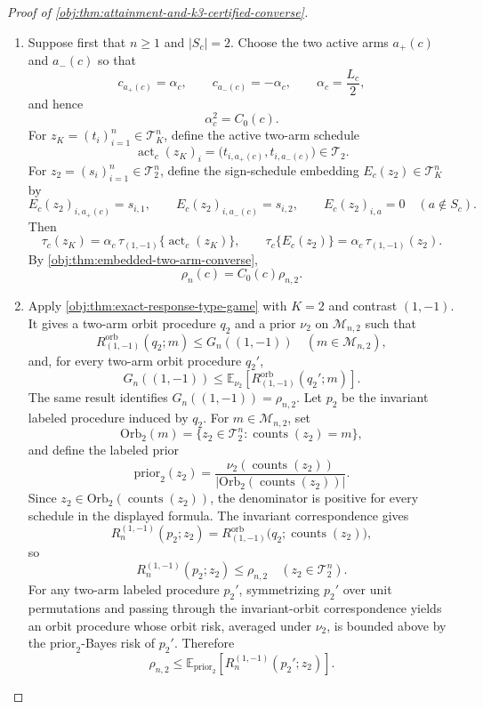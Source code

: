 \documentclass[11pt]{article}
\begin{document}
\begin{proof}[Proof of \cref{obj:thm:attainment-and-k3-certified-converse}]
\begin{enumerate}
\item Suppose first that \(n\ge 1\) and \(|S_c|=2\). Choose the two active arms \(a_+(c)\) and \(a_-(c)\) so that
\[
c_{a_+(c)}=\alpha_c,\qquad c_{a_-(c)}=-\alpha_c,\qquad
\alpha_c=\frac{L_c}{2},
\]
and hence
\[
\alpha_c^2=C_0(c).
\]
For \(z_K=(t_i)_{i=1}^n\in\mathcal T_K^n\), define the active two-arm schedule
\[
\operatorname{act}_c(z_K)_i
=
\bigl(t_{i,a_+(c)},t_{i,a_-(c)}\bigr)\in\mathcal T_2.
\]
For \(z_2=(s_i)_{i=1}^n\in\mathcal T_2^n\), define the sign-schedule embedding \(E_c(z_2)\in\mathcal T_K^n\) by
\[
E_c(z_2)_{i,a_+(c)}=s_{i,1},\qquad
E_c(z_2)_{i,a_-(c)}=s_{i,2},\qquad
E_c(z_2)_{i,a}=0\quad(a\notin S_c).
\]
Then
\[
\tau_c(z_K)
=
\alpha_c\,\tau_{(1,-1)}\{\operatorname{act}_c(z_K)\},
\qquad
\tau_c\{E_c(z_2)\}
=
\alpha_c\,\tau_{(1,-1)}(z_2).
\]
By \cref{obj:thm:embedded-two-arm-converse},
\[
\rho_n(c)=C_0(c)\rho_{n,2}.
\]

\item Apply \cref{obj:thm:exact-response-type-game} with \(K=2\) and contrast \((1,-1)\). It gives a two-arm orbit procedure \(q_2\) and a prior \(\nu_2\) on \(\mathcal M_{n,2}\) such that
\[
R^{\mathrm{orb}}_{(1,-1)}(q_2;m)\le G_n((1,-1))
\quad(m\in\mathcal M_{n,2}),
\]
and, for every two-arm orbit procedure \(q_2'\),
\[
G_n((1,-1))
\le
\mathbb E_{\nu_2}\!\left[
R^{\mathrm{orb}}_{(1,-1)}(q_2';m)
\right].
\]
The same result identifies \(G_n((1,-1))=\rho_{n,2}\). Let \(p_2\) be the invariant labeled procedure induced by \(q_2\). For \(m\in\mathcal M_{n,2}\), set
\[
\mathrm{Orb}_2(m)
=
\{z_2\in\mathcal T_2^n:\operatorname{counts}(z_2)=m\},
\]
and define the labeled prior
\[
\mathrm{prior}_2(z_2)
=
\frac{\nu_2(\operatorname{counts}(z_2))}
{|\mathrm{Orb}_2(\operatorname{counts}(z_2))|}.
\]
Since \(z_2\in \mathrm{Orb}_2(\operatorname{counts}(z_2))\), the denominator is positive for every schedule in the displayed formula. The invariant correspondence gives
\[
R_n^{(1,-1)}(p_2;z_2)
=
R^{\mathrm{orb}}_{(1,-1)}
\bigl(q_2;\operatorname{counts}(z_2)\bigr),
\]
so
\[
R_n^{(1,-1)}(p_2;z_2)\le \rho_{n,2}
\quad(z_2\in\mathcal T_2^n).
\]
For any two-arm labeled procedure \(p_2'\), symmetrizing \(p_2'\) over unit permutations and passing through the invariant-orbit correspondence yields an orbit procedure whose orbit risk, averaged under \(\nu_2\), is bounded above by the \(\mathrm{prior}_2\)-Bayes risk of \(p_2'\). Therefore
\[
\rho_{n,2}
\le
\mathbb E_{\mathrm{prior}_2}\!\left[
R_n^{(1,-1)}(p_2';z_2)
\right].
\]


\end{enumerate}
\end{proof}
\end{document}
